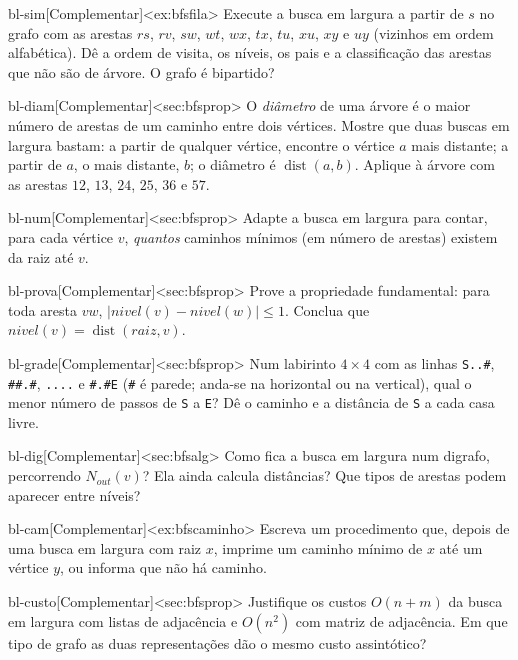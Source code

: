 \excompl
\begin{exercicio}{bl-sim}[Complementar]<ex:bfsfila>
Execute a busca em largura a partir de $s$ no grafo com as arestas $rs$, $rv$, $sw$, $wt$, $wx$, $tx$, $tu$, $xu$, $xy$ e $uy$ (vizinhos em ordem alfabética). Dê a ordem de visita, os níveis, os pais e a classificação das arestas que não são de árvore. O grafo é bipartido?
\end{exercicio}
\begin{exercicio}{bl-diam}[Complementar]<sec:bfsprop>
O \emph{diâmetro} de uma árvore é o maior número de arestas de um caminho entre dois vértices. Mostre que duas buscas em largura bastam: a partir de qualquer vértice, encontre o vértice $a$ mais distante; a partir de $a$, o mais distante, $b$; o diâmetro é $\operatorname{dist}(a,b)$. Aplique à árvore com as arestas $12$, $13$, $24$, $25$, $36$ e $57$.
\end{exercicio}
\begin{exercicio}{bl-num}[Complementar]<sec:bfsprop>
Adapte a busca em largura para contar, para cada vértice $v$, \emph{quantos} caminhos mínimos (em número de arestas) existem da raiz até $v$.
\end{exercicio}
\begin{exercicio}{bl-prova}[Complementar]<sec:bfsprop>
Prove a propriedade fundamental: para toda aresta $vw$, $|nivel(v)-nivel(w)|\le1$. Conclua que $nivel(v)=\operatorname{dist}(raiz,v)$.
\end{exercicio}
\begin{exercicio}{bl-grade}[Complementar]<sec:bfsprop>
Num labirinto $4\times4$ com as linhas \texttt{S..\#}, \texttt{\#\#.\#}, \texttt{....} e \texttt{\#.\#E} (\texttt{\#} é parede; anda-se na horizontal ou na vertical), qual o menor número de passos de \texttt{S} a \texttt{E}? Dê o caminho e a distância de \texttt{S} a cada casa livre.
\end{exercicio}
\begin{exercicio}{bl-dig}[Complementar]<sec:bfsalg>
Como fica a busca em largura num digrafo, percorrendo $N_{out}(v)$? Ela ainda calcula distâncias? Que tipos de arestas podem aparecer entre níveis?
\end{exercicio}
\begin{exercicio}{bl-cam}[Complementar]<ex:bfscaminho>
Escreva um procedimento que, depois de uma busca em largura com raiz $x$, imprime um caminho mínimo de $x$ até um vértice $y$, ou informa que não há caminho.
\end{exercicio}
\begin{exercicio}{bl-custo}[Complementar]<sec:bfsprop>
Justifique os custos $O(n+m)$ da busca em largura com listas de adjacência e $O(n^2)$ com matriz de adjacência. Em que tipo de grafo as duas representações dão o mesmo custo assintótico?
\end{exercicio}
